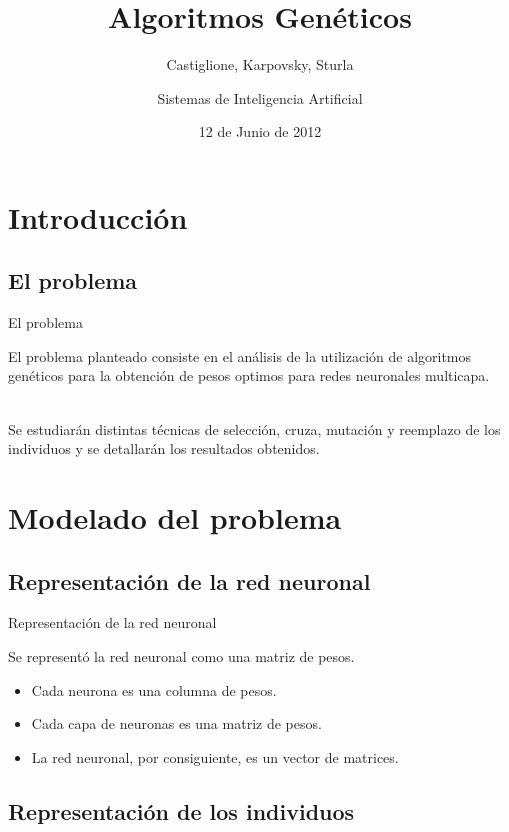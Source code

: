 \documentclass{beamer}
\title{Algoritmos Genéticos}
\subtitle{Castiglione, Karpovsky, Sturla }
\author{Sistemas de Inteligencia Artificial}
\date{12 de Junio de 2012}
\begin{document}
\frame{\titlepage}

\section[Outline]{}
\frame{\tableofcontents}

\section{Introducción}
\subsection{El problema}
\begin{frame}{El problema}

\par El problema planteado consiste en el análisis de la utilización de algoritmos genéticos para la obtención de pesos optimos para redes neuronales multicapa.\\
\ \\

\par Se estudiarán distintas técnicas de selección, cruza, mutación y reemplazo de los individuos y se detallarán los resultados obtenidos.

\end{frame}

\section{Modelado del problema}
\subsection{Representación de la red neuronal}

\begin{frame}{Representación de la red neuronal}
\par Se representó la red neuronal como una matriz de pesos. \\
\begin{itemize}
\item Cada neurona es una columna de pesos.
\item Cada capa de neuronas es una matriz de pesos.
\item La red neuronal, por consiguiente, es un vector de matrices.
\end{itemize}
\end{frame}

\subsection{Representación de los individuos}
\end{document}
